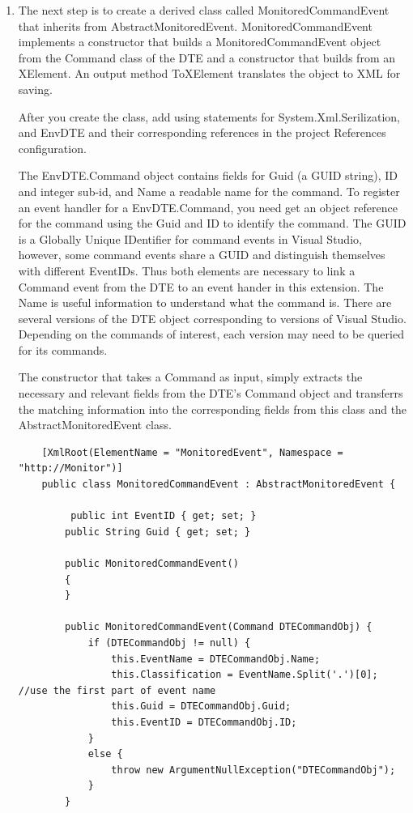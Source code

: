 \begin{Exercise}[ type={program}, difficulty={1}]
\begin{enumerate}
\item
The next step is to create a derived class called MonitoredCommandEvent that inherits from AbstractMonitoredEvent.  MonitoredCommandEvent implements a constructor that builds a MonitoredCommandEvent object from the Command class of the DTE and a constructor that builds from an XElement.  An output method ToXElement translates the object to XML for saving.

After you create the class, add using statements for System.Xml.Serilization, and EnvDTE and their corresponding references in the project References configuration. 

The EnvDTE.Command object contains fields for Guid (a GUID string), ID and integer sub-id, and Name a readable name for the command.  To register an event handler for a EnvDTE.Command, you need get an object reference for the command using the Guid and ID to identify the command.  The GUID is  a Globally Unique IDentifier for command events in Visual Studio, however, some command events share a GUID and distinguish themselves with different EventIDs. Thus both elements are necessary to link a Command event from the DTE to an event hander in this extension.  The Name is useful information to understand what the command is.    There are several versions of the DTE object corresponding to versions of Visual Studio.  Depending on the commands of interest, each version may need to be queried for its commands.  

 The constructor that takes a Command as input, simply extracts the necessary and relevant fields from the DTE's Command object and transferrs the matching information into the corresponding fields from this class and the AbstractMonitoredEvent class.  


\begin{lstlisting}
    [XmlRoot(ElementName = "MonitoredEvent", Namespace = "http://Monitor")]
    public class MonitoredCommandEvent : AbstractMonitoredEvent {

         public int EventID { get; set; }
        public String Guid { get; set; }

        public MonitoredCommandEvent()
        {
        }

        public MonitoredCommandEvent(Command DTECommandObj) {
            if (DTECommandObj != null) {
                this.EventName = DTECommandObj.Name;
                this.Classification = EventName.Split('.')[0];  //use the first part of event name
                this.Guid = DTECommandObj.Guid;
                this.EventID = DTECommandObj.ID;
            }
            else {
                throw new ArgumentNullException("DTECommandObj");
            }
        }
\end{lstlisting}


\end{enumerate}
\end{Exercise}
